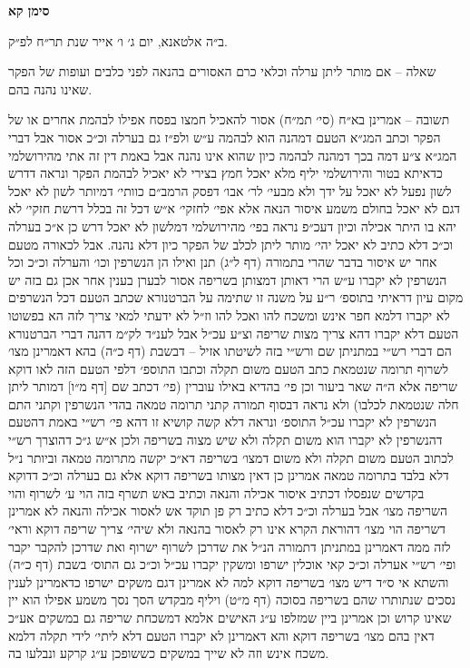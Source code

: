 \documentclass[12pt, openany]{book}
\newcommand{\chapname}{}
\newcommand{\newchap}[1]{
	\addcontentsline{toc}{chapter}{#1}
	\renewcommand{\chapname}{#1}
		\begin{center}
			\textbf{%
\fontsize{16pt}{16pt}\selectfont
				#1}
		\end{center}
}
\begin{document}
\newchap{סימן קא}
\begin{multicols}{2}
ב״ה אלטאנא, יום ג׳ ו׳ אייר שנת תר״ח לפ״ק.\\\vspace{0pt}

שאלה – אם מותר ליתן ערלה וכלאי כרם האסורים בהנאה לפני כלבים ועופות של הפקר שאינו נהנה בהם.\\\vspace{0pt}

תשובה – אמרינן בא״ח (סי׳ תמ״ח) אסור להאכיל חמצו בפסח אפילו לבהמת אחרים או של הפקר וכתב המג״א הטעם דמהנה הוא לבהמה ע״ש ולפ״ז גם בערלה וכ״כ אסור אבל דברי המג״א צ״ע דמה בכך דמהנה לבהמה כיון שהוא אינו נהנה אבל באמת דין זה אתי מהירושלמי כדאיתא בטור והירושלמי יליף מלא יאכל חמץ בצירי לא יאכיל לבהמת הפקר ונראה דדרש לשון נפעל לא יאכל על ידך ולא מבעי׳ לר׳ אבו׳ דפסק הרמב״ם כוותי׳ דמיותר לשון לא יאכל דגם לא יאכל בחולם משמע איסור הנאה אלא אפי׳ לחזקי׳ א״ש דכל זה בכלל דרשת חזקי׳ לא יהא בו היתר אכילה וכיון דעכ״פ נראה בפי׳ מהירושלמי דמלשון לא יאכל דרש כן א״כ בערלה וכ״כ דלא כתיב לא יאכל יהי׳ מותר ליתן לכלב של הפקר כיון דלא נהנה. אבל לכאורה מטעם אחר יש איסור בדבר שהרי בתמורה (דף ל״ג) תנן ואילו הן הנשרפין וכו׳ והערלה וכ״כ וכל הנשרפין לא יקברו ע״ש הרי דאותן דמצותן בשריפה אסור לבערן בענין אחר אכן גם בזה יש מקום עיון דראיתי בתוספ׳ ר״ע על משנה זו שתימה על הברטנורא שכתב הטעם דכל הנשרפים לא יקברו דלמא חפר אינש ומשכח להו ואכל להו וז״ל לא ידעתי למאי צריך לזה הא בפשוטו הטעם דלא יקברו דהא צריך מצות שריפה וצ״ע עכ״ל אבל לענ״ד לק״מ דהנה דברי הברטנורא הם דברי רש״י במתניתן שם ורש״י בזה לשיטתו אזיל – דבשבת (דף כ״ה) בהא דאמרינן מצו׳ לשרוף תרומה שנטמאת כתב הטעם משום תקלה וכתבו התוספ׳ דלפי הטעם הזה לאו דוקא שריפה אלא ה״ה שאר ביעור וכן פי׳ בהדיא באילו עוברין (פי׳ דכתב שם [דף מ״ו] דמותר ליתן חלה שנטמאת לכלבו) ולא נראה דבסוף תמורה קתני תרומה טמאה בהדי הנשרפין וקתני התם הנשרפין לא יקברו עכ״ל התוספ׳ ונראה דלא קשה קושיא זו דהא פי׳ רש״י באמת דהטעם דהנשרפין לא יקברו הוא משום תקלה ולא שיש מצוה בשריפה ולכן א״ש ג״כ דהוצרך רש״י לכתוב הטעם משום תקלה ולא משום דמצו׳ בשריפה דא״כ יקשה מתרומה טמאה וביותר נ״ל דלא בלבד בתרומה טמאה אמרינן כן דאין מצותו בשריפה דוקא אלא גם בערלה וכ״כ דדוקא בקדשים שנפסלו דכתיב איסור אכילה והנאה וכתיב באש תשרף בזה הוי ע׳ לשרוף והוי השריפה מצו׳ אבל בערלה וכ״כ דלא כתיב רק פן תוקד אש לאסור אכילה והנאה לא אמרינן דשריפה הוי מצו׳ דהוראת הקרא אינו רק לאסור בהנאה ולא שיהי׳ צריך שריפה דוקא וראי׳ לזה ממה דאמרינן במתניתן דתמורה הנ״ל את שדרכן לשרוף ישרוף ואת שדרכן להקבר יקבר ופי׳ רש״י אערלה וכ״כ קאי אוכלין ישרפו ומשקין יקברו עכ״ל וכ״כ גם התוס׳ בשבת (דף כ״ה) והשתא אי ס״ד דיש מצו׳ בשריפה דוקא למה לא אמרינן דגם משקים ישרפו כדאמרינן לענין נסכים שנתותרו שהם בשריפה בסוכה (דף מ״ט) ויליף מבקדש הסך נסך משמע אפילו הוא יין שאינו קרוש וכן אמרינן ביין שמזלפו ע״ג האישים אלמא דמשכחת שריפה גם במשקים אע״כ דאין בהם מצו׳ בשריפה דוקא והא דאמרינן לא יקברו הטעם דלא ליתי׳ לידי תקלה דלמא משכח אינש וזה לא שייך במשקים כששופכן ע״ג קרקע ונבלעו בה.\\\vspace{0pt}


\end{multicols}
\end{document}
